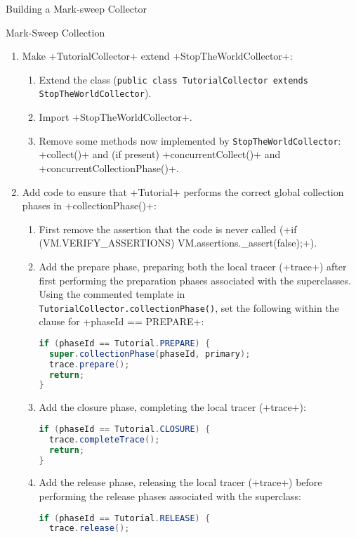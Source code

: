 \begin{chapter}{Building a Mark-sweep Collector}
\begin{section}{Mark-Sweep Collection}
\begin{enumerate}
    \begin{enumerate}
      \item Make \spverb+TutorialCollector+ extend \spverb+StopTheWorldCollector+:
        \begin{enumerate}
          \item Extend the class (\texttt{public class Tutorial\-Collector ex\-tends Stop\-The\-World\-Collector}).
          \item Import \spverb+StopTheWorldCollector+.
          \item Remove some methods now implemented by \texttt{Stop\-The\-World\-Col\-lec\-tor}: \spverb+collect()+ and (if present) \spverb+concurrentCollect()+ and \newline \spverb+concurrentCollectionPhase()+.
        \end{enumerate}
      \item Add code to ensure that \spverb+Tutorial+ performs the correct global collection phases in \spverb+collectionPhase()+:
        \begin{enumerate}
           \item First remove the assertion that the code is never called (\spverb+if (VM.VERIFY_ASSERTIONS) VM.assertions._assert(false);+).
           \item Add the prepare phase, preparing both the local tracer (\spverb+trace+) after first performing the preparation phases associated with the superclasses. Using the commented template in \texttt{Tu\-to\-rial\-Col\-lec\-tor.col\-lec\-tion\-Pha\-se()}, set the following within the clause for \spverb+phaseId == PREPARE+:
             \begin{lstlisting}[language=Java]
if (phaseId == Tutorial.PREPARE) {
  super.collectionPhase(phaseId, primary);
  trace.prepare();
  return;
}
             \end{lstlisting}
           \item Add the closure phase, completing the local tracer (\spverb+trace+):
             \begin{lstlisting}[language=Java]
if (phaseId == Tutorial.CLOSURE) {
  trace.completeTrace();
  return;
}
             \end{lstlisting}
           \item Add the release phase, releasing the local tracer (\spverb+trace+) before performing the release phases associated with the superclass:
             \begin{lstlisting}[language=Java]
if (phaseId == Tutorial.RELEASE) {
  trace.release();

\end{lstlisting}
\end{enumerate}
\end{enumerate}
\end{enumerate}
\end{section}
\end{chapter}
